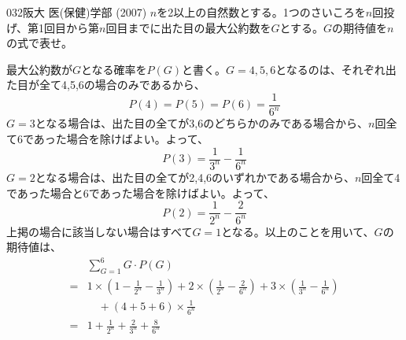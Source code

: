 \begin{prob}{032}{}{阪大 医(保健)学部 (2007)}
 $n$を2以上の自然数とする。1つのさいころを$n$回投げ、第1回目から第$n$回目までに出た目の最大公約数を$G$とする。$G$の期待値を$n$の式で表せ。
\end{prob}

最大公約数が$G$となる確率を$P(G)$と書く。$G=4,5,6$となるのは、それぞれ出た目が全て4,5,6の場合のみであるから、
\[ P(4)=P(5)=P(6)=\frac{1}{6^n} \]
$G=3$となる場合は、出た目の全てが3,6のどちらかのみである場合から、$n$回全て6であった場合を除けばよい。よって、
\[ P(3)=\frac{1}{3^n}-\frac{1}{6^n} \]
$G=2$となる場合は、出た目の全てが2,4,6のいずれかである場合から、$n$回全て4であった場合と6であった場合を除けばよい。よって、
\[ P(2)=\frac{1}{2^n}-\frac{2}{6^n} \]
上掲の場合に該当しない場合はすべて$G=1$となる。以上のことを用いて、$G$の期待値は、
\begin{align*}
 &\sum_{G=1}^6 G\cdot P(G)　\\
 =& 1\times \left(1-\frac{1}{2^n}-\frac{1}{3^n}\right)+2\times\left(\frac{1}{2^n}-\frac{2}{6^n}\right)+3\times\left(\frac{1}{3^n}-\frac{1}{6^n}\right) \\
 &\quad +(4+5+6)\times\frac{1}{6^n} \\
 =& 1+\frac{1}{2^n}+\frac{2}{3^n}+\frac{8}{6^n}
\end{align*}